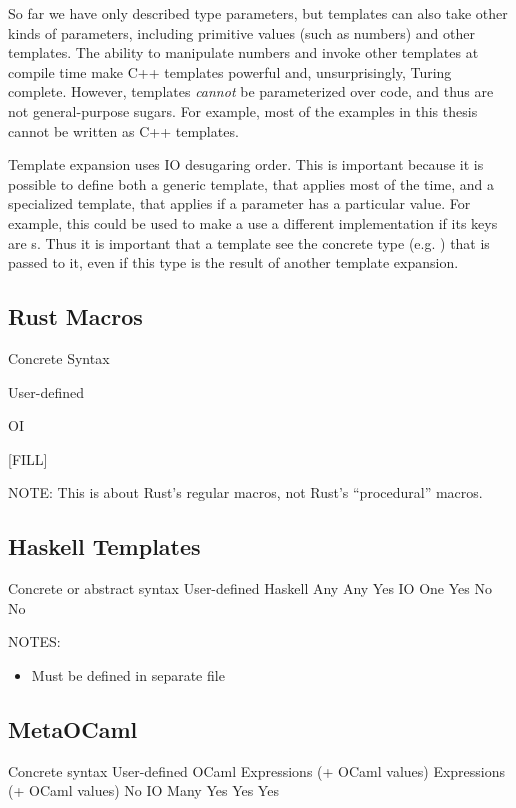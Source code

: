 So far we have only described type parameters, but templates can also
take other kinds of parameters, including primitive values (such as
numbers) and other templates. The ability to manipulate numbers and
invoke other templates at compile time make C++ templates powerful
and, unsurprisingly, Turing complete. However, templates \emph{cannot}
be parameterized over code, and thus are not general-purpose sugars.
For example, most of the examples in this thesis cannot be written as
C++ templates.

Template expansion uses IO desugaring order. This is important because
it is possible
to define both a generic template, that applies most of the time, and
a specialized template, that applies if a parameter has a particular
value. For example, this could be used to make a  use a different
implementation if its keys are s. Thus it is important that
a template see the concrete type (e.g. ) that is passed to
it, even if this type is the result of another template expansion.


\subsection{Rust Macros} \label{sec:rust}

 Concrete Syntax

 User-defined

 OI

 [FILL]

NOTE: This is about Rust's regular macros, not Rust's ``procedural'' macros.


\subsection{Haskell Templates} \label{sec:haskell}

 Concrete or abstract syntax
 User-defined
 Haskell
 Any
 Any
 Yes
 IO
 One
 Yes
 No
 No

NOTES:
\begin{itemize}
  \item Must be defined in separate file
\end{itemize}


\subsection{MetaOCaml} \label{sec:metaocaml}

 Concrete syntax
 User-defined
 OCaml
 Expressions (+ OCaml values)
 Expressions (+ OCaml values)
 No
 IO
 Many
 Yes
 Yes
 Yes
